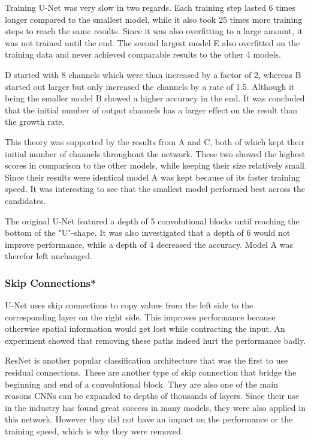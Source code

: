 Training U-Net was very slow in two regards. Each training step lasted 6 times longer compared to the smallest model, while it also took 25 times more training steps to reach the same results. Since it was also overfitting to a large amount, it was not trained until the end. The second largest model E also overfitted on the training data and never achieved comparable results to the other 4 models.

D started with 8 channels which were than increased by a factor of 2, whereas B started out larger but only increased the channels by a rate of 1.5. Although it being the smaller model B showed a higher accuracy in the end. It was concluded that the initial number of output channels has a larger effect on the result than the growth rate.

This theory was supported by the results from A and C, both of which kept their initial number of channels throughout the network. These two showed the highest scores in comparison to the other models, while keeping their size relatively small. Since their results were identical model A was kept because of its faster training speed. It was interesting to see that the smallest model performed best across the candidates.

The original U-Net featured a depth of 5 convolutional blocks until reaching the bottom of the "U"-shape. It was also investigated that a depth of 6 would not improve performance, while a depth of 4 decreased the accuracy. Model A was therefor left unchanged.

\subsubsection{Skip Connections*}

U-Net uses skip connections to copy values from the left side to the corresponding layer on the right side. This improves performance because otherwise spatial information would get lost while contracting the input. An experiment showed that removing these paths indeed hurt the performance badly.

ResNet \cite{He2015a} is another popular classification architecture that was the first to use residual connections. These are another type of skip connection that bridge the beginning and end of a convolutional block. They are also one of the main reasons CNNs can be expanded to depths of thousands of layers. Since their use in the industry has found great success in many models, they were also applied in this network. However they did not have an impact on the performance or the training speed, which is why they were removed.

